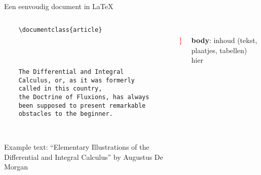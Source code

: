 \begin{frame}[fragile, t]{Een eenvoudig document in \LaTeX}
	\begin{columns}[t]
        \begin{column}{0.6\textwidth}
			\vspace{-20pt}
	\begin{verbatim} 
	\documentclass{article}

		
	

	The Differential and Integral 
	Calculus, or, as it was formerly 
	called in this country, 
	the Doctrine of Fluxions, has always 
	been supposed to present remarkable 
	obstacles to the beginner.

	
	\end{verbatim}

	{\tiny
	Example text: ``Elementary Illustrations of the Differential and Integral Calculus''
	by Augustus De Morgan
	\par}
\end{column}
\begin{column}{0.05\textwidth}
	\vspace{0pt}

	\phantom{{\Huge \textcolor{red}{ \} } }}\\[1.5cm]
	{\Huge \textcolor{red}{ \} } }
\end{column}
\begin{column}{0.3\textwidth}
	\vspace{0pt}

	\leavevmode{} \phantom{here}\\[1.5cm]
	\textbf{body}: inhoud (tekst, plaatjes, tabellen) hier
\end{column}
\end{columns}

\end{frame}
